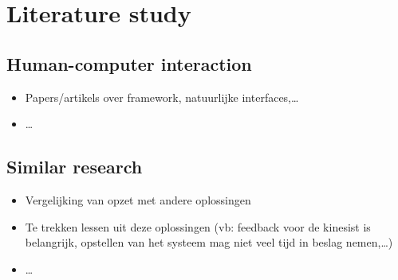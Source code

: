 \chapter{Literature study}

\section{Human-computer interaction}

\begin{itemize}
\item Papers/artikels over framework, natuurlijke interfaces,\ldots
\item \ldots
\end{itemize}


\section{Similar research}

\begin{itemize}
\item Vergelijking van opzet met andere oplossingen 
\item Te trekken lessen uit deze oplossingen (vb: feedback voor de kinesist is belangrijk, opstellen van het systeem mag niet veel tijd in beslag nemen,\ldots)
\item \ldots
\end{itemize}